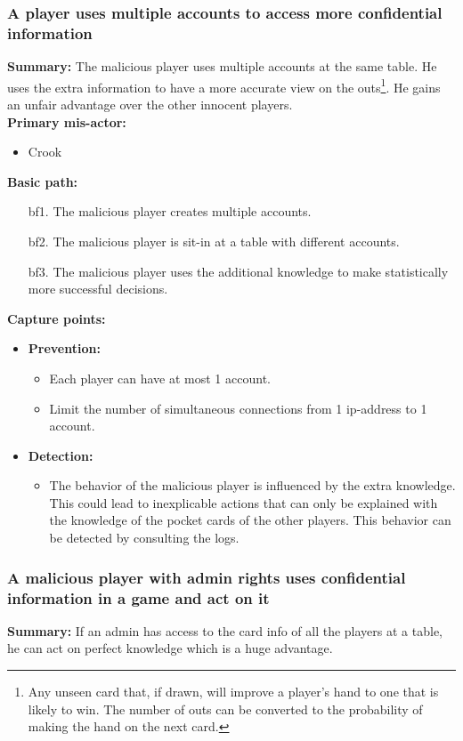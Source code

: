 \documentclass[a4paper,11pt]{report}
\begin{document}
\subsubsection{A player uses multiple accounts to access more confidential information}
\textbf{Summary:} The malicious player uses multiple accounts at the same table. He uses the extra information to  have a more accurate view on the outs\footnote{Any unseen card that, if drawn, will improve a player's hand to one that is likely to win. The number of outs can be converted to the probability of making the hand on the next card.}. He gains an unfair advantage over the other innocent players. \\
\textbf{Primary mis-actor:}
\begin{itemize}
\item Crook
\end{itemize}
\textbf{Basic path:}
\begin{enumerate}
\item[bf1.] The malicious player creates multiple accounts. 
\item[bf2.] The malicious player is sit-in at a table with different accounts.
\item[bf3.] The malicious player uses the additional knowledge to make statistically more successful decisions. 
\end{enumerate}
\textbf{Capture points:}
\begin{itemize}
\item \textbf{Prevention:}
\begin{itemize}
\item Each player can have at most 1 account.
\item Limit the number of simultaneous connections from 1 ip-address to 1 account.
\end{itemize}
\item \textbf{Detection:}
\begin{itemize}
\item The behavior of the malicious player is influenced by the extra knowledge. This could lead to inexplicable actions that can only be explained with the knowledge of the pocket cards of the other players. This behavior can be detected by consulting the logs.
\end{itemize}
\end{itemize}
\subsubsection{A malicious player with admin rights uses confidential information in a game and act on it}
\textbf{Summary:} If an admin has access to the card info of all the players at a table, he can act on perfect knowledge which is a huge advantage.
\end{document}
